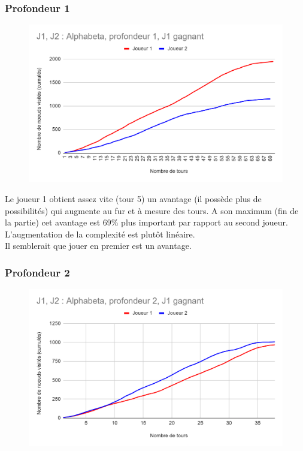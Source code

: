 \documentclass[12pt]{article}
\begin{document}
\subsubsection{Profondeur 1}

\begin{figure}[!h]
   \includegraphics[width=\textwidth]{prof1alphabeta.png}
\end{figure}

Le joueur 1 obtient assez vite (tour 5) un avantage (il possède plus de possibilités) qui augmente au fur et à mesure des tours. A son maximum (fin de la partie) cet avantage est 69\% plus important par rapport au second joueur.\\
L’augmentation de la complexité est plutôt linéaire.\\
Il semblerait que jouer en premier est un avantage.
\newpage
\subsubsection{Profondeur 2}

\begin{figure}[!h]
   \includegraphics[width=\textwidth]{prof2alphabeta.png}
\end{figure}
\end{document}
